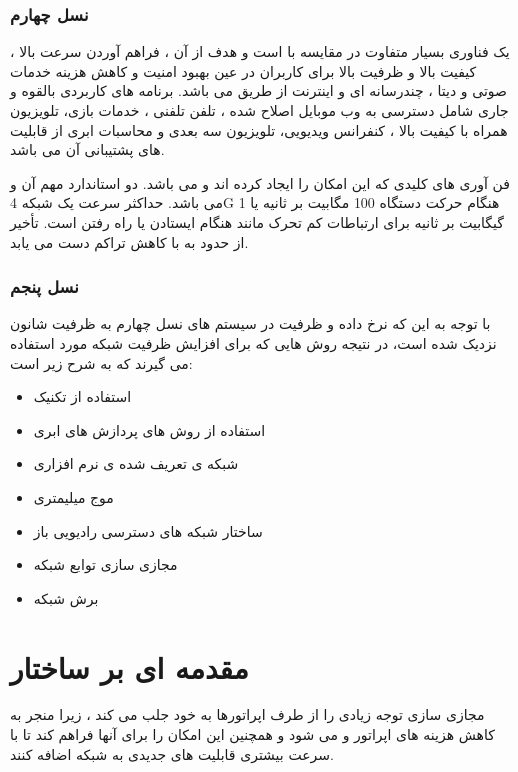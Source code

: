 \subsubsection{نسل چهارم}
 یک فناوری بسیار متفاوت در مقایسه با  است و هدف از آن ، فراهم آوردن سرعت بالا ، کیفیت بالا و ظرفیت بالا برای کاربران در عین بهبود امنیت و کاهش هزینه خدمات صوتی و دیتا ، چندرسانه ای و اینترنت از طریق  می باشد. برنامه های کاربردی بالقوه و جاری شامل دسترسی به وب موبایل اصلاح شده ، تلفن تلفنی ، خدمات بازی، تلویزیون همراه با کیفیت بالا ، کنفرانس ویدیویی، تلویزیون سه بعدی و محاسبات ابری از قابلیت های پشتیبانی آن می باشد.

فن آوری های کلیدی که این امکان را ایجاد کرده اند 
 
 و
   
می باشد.
دو استاندارد مهم آن
 
و
می باشد.
حداکثر سرعت یک شبکه 4G هنگام حرکت دستگاه 100 مگابیت بر ثانیه یا 1 گیگابیت بر ثانیه برای ارتباطات کم تحرک مانند هنگام ایستادن یا راه رفتن است. تأخیر از حدود  به   با کاهش تراکم دست می یابد.
 \subsubsection{نسل پنجم}
 با توجه
به این که نرخ داده و ظرفیت در سیستم های نسل چهارم به ظرفیت
شانون نزدیک شده است، در نتیجه روش هایی که برای
افزایش ظرفیت شبکه مورد استفاده می گیرند که به شرح زیر است:
\begin{itemize}
\item
استفاده از تکنیک 
\item
استفاده از روش های پردازش های ابری
\item
شبکه ی تعریف شده ی نرم افزاری
\item
موج میلیمتری
\item 
ساختار شبکه های دسترسی رادیویی باز
\item 
مجازی سازی توابع شبکه
\item 
برش شبکه
\end{itemize}
\section{مقدمه ای بر ساختار }
مجازی سازی  توجه زیادی را از طرف اپراتورها به خود جلب می کند ، زیرا منجر به کاهش هزینه های اپراتور و  می شود و همچنین این امکان را برای آنها فراهم کند تا با سرعت بیشتری قابلیت های جدیدی به شبکه اضافه کنند.

